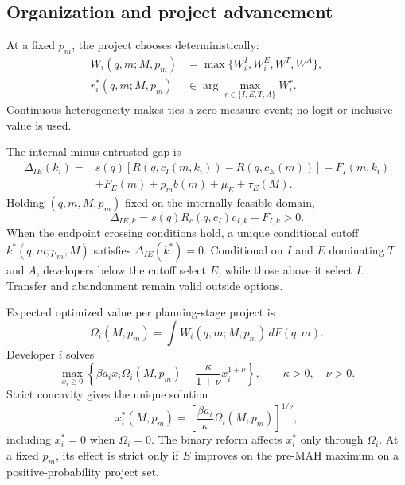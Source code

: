 \documentclass[12pt]{article}
\newcommand{\1}{\mathbf{1}}
\begin{document}
\subsection{Organization and project advancement}
\label{subsec:p16m-organization}

At a fixed \(p_m\), the project chooses deterministically:
\begin{equation}
  \begin{aligned}
  W_i(q,m;M,p_m)
  &=
  \max\{W_i^I,W_i^E,W^T,W^A\},\\
  r_i^*(q,m;M,p_m)
  &\in
  \arg\max_{r\in\{I,E,T,A\}} W_i^r.
  \end{aligned}
  \label{eq:p16m-route-choice}
\end{equation}
Continuous heterogeneity makes ties a zero-measure event; no logit or
inclusive value is used.

The internal-minus-entrusted gap is
\begin{equation}
  \begin{aligned}
  \Delta_{IE}(k_i)
  ={}&
  s(q)\!\left[
  R\!\left(q,c_I(m,k_i)\right)-R\!\left(q,c_E(m)\right)
  \right]-F_I(m,k_i)\\
  &+F_E(m)+p_mb(m)+\mu_E+\tau_E(M).
  \end{aligned}
  \label{eq:p16m-gap}
\end{equation}
Holding \((q,m,M,p_m)\) fixed on the internally feasible domain,
\[
  \Delta_{IE,k}
  =
  s(q)R_c\!\left(q,c_I\right)c_{I,k}-F_{I,k}>0.
\]
When the endpoint crossing conditions hold, a unique conditional cutoff
\(k^*(q,m;p_m,M)\) satisfies \(\Delta_{IE}(k^*)=0\). Conditional on \(I\)
and \(E\) dominating \(T\) and \(A\), developers below the cutoff select
\(E\), while those above it select \(I\). Transfer and abandonment remain
valid outside options.

Expected optimized value per planning-stage project is
\begin{equation}
  \Omega_i(M,p_m)
  =
  \int W_i(q,m;M,p_m)\,dF(q,m).
  \label{eq:p16m-omega}
\end{equation}
Developer \(i\) solves
\begin{equation}
  \max_{x_i\geq0}
  \left\{
  \beta a_ix_i\Omega_i(M,p_m)
  -
  \frac{\kappa}{1+\nu}x_i^{1+\nu}
  \right\},
  \qquad \kappa>0,\quad \nu>0.
  \label{eq:p16m-advancement-problem}
\end{equation}
Strict concavity gives the unique solution
\begin{equation}
  x_i^*(M,p_m)
  =
  \left[
  \frac{\beta a_i}{\kappa}\Omega_i(M,p_m)
  \right]^{1/\nu},
  \label{eq:p16m-advancement}
\end{equation}
including \(x_i^*=0\) when \(\Omega_i=0\). The binary reform affects
\(x_i^*\) only through \(\Omega_i\). At a fixed \(p_m\), its effect is
strict only if \(E\) improves on the pre-MAH maximum on a
positive-probability project set.
\end{document}

